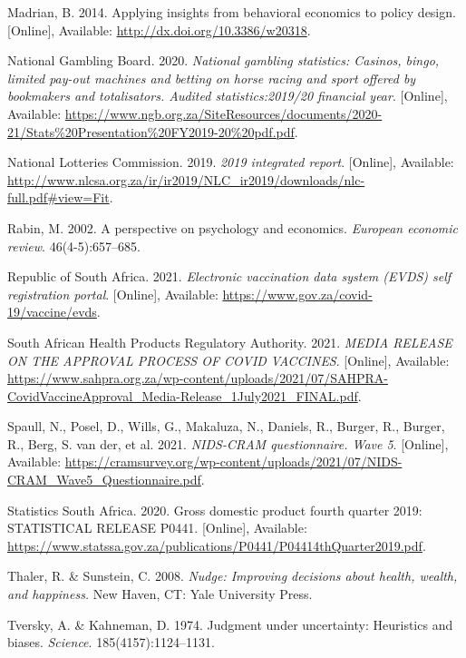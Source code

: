 \documentclass[11pt,preprint, authoryear]{elsarticle}
\numberwithin{equation}{section}
\numberwithin{figure}{section}
\numberwithin{table}{section}
\newlength{\cslhangindent}
\newenvironment{CSLReferences}%
  {\setlength{\parindent}{0pt}%
  \everypar{\setlength{\hangindent}{\cslhangindent}}\ignorespaces}%
  {\par}
\begin{document}
\begin{CSLReferences}{1}{0}
\leavevmode\hypertarget{ref-flu}{}%
Madrian, B. 2014. Applying insights from behavioral economics to policy
design. {[}Online{]}, Available: \url{http://dx.doi.org/10.3386/w20318}.

\leavevmode\hypertarget{ref-gamble}{}%
National Gambling Board. 2020. \emph{National gambling statistics:
Casinos, bingo, limited pay-out machines and betting on horse racing and
sport offered by bookmakers and totalisators. Audited statistics:2019/20
financial year}. {[}Online{]}, Available:
\url{https://www.ngb.org.za/SiteResources/documents/2020-21/Stats\%20Presentation\%20FY2019-20\%20pdf.pdf}.

\leavevmode\hypertarget{ref-lotto}{}%
National Lotteries Commission. 2019. \emph{2019 integrated report}.
{[}Online{]}, Available:
\url{http://www.nlcsa.org.za/ir/ir2019/NLC_ir2019/downloads/nlc-full.pdf\#view=Fit}.

\leavevmode\hypertarget{ref-rabin}{}%
Rabin, M. 2002. A perspective on psychology and economics.
\emph{European economic review}. 46(4-5):657--685.

\leavevmode\hypertarget{ref-evds}{}%
Republic of South Africa. 2021. \emph{Electronic vaccination data system
(EVDS) self registration portal}. {[}Online{]}, Available:
\url{https://www.gov.za/covid-19/vaccine/evds}.

\leavevmode\hypertarget{ref-sah}{}%
South African Health Products Regulatory Authority. 2021. \emph{MEDIA
RELEASE ON THE APPROVAL PROCESS OF COVID VACCINES}. {[}Online{]},
Available:
\url{https://www.sahpra.org.za/wp-content/uploads/2021/07/SAHPRA-CovidVaccineApproval_Media-Release_1July2021_FINAL.pdf}.

\leavevmode\hypertarget{ref-quest}{}%
Spaull, N., Posel, D., Wills, G., Makaluza, N., Daniels, R., Burger, R.,
Burger, R., Berg, S. van der, et al. 2021. \emph{NIDS-CRAM
questionnaire. Wave 5}. {[}Online{]}, Available:
\url{https://cramsurvey.org/wp-content/uploads/2021/07/NIDS-CRAM_Wave5_Questionnaire.pdf}.

\leavevmode\hypertarget{ref-statsa}{}%
Statistics South Africa. 2020. Gross domestic product fourth quarter
2019: STATISTICAL RELEASE P0441. {[}Online{]}, Available:
\url{https://www.statssa.gov.za/publications/P0441/P04414thQuarter2019.pdf}.

\leavevmode\hypertarget{ref-nudge}{}%
Thaler, R. \& Sunstein, C. 2008. \emph{Nudge: Improving decisions about
health, wealth, and happiness.} New Haven, CT: Yale University Press.

\leavevmode\hypertarget{ref-khan}{}%
Tversky, A. \& Kahneman, D. 1974. Judgment under uncertainty: Heuristics
and biases. \emph{Science}. 185(4157):1124--1131.


\end{CSLReferences}
\end{document}
